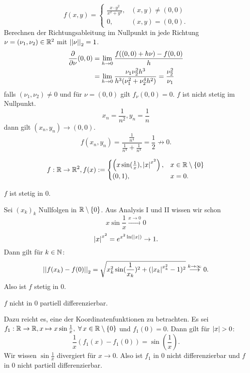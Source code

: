 \documentclass[../ana2u.tex]{subfiles}
\begin{document}
\begin{bsp}
    \[ f(x,y) = \begin{cases}
        \frac{x\cdot y^2}{x^2 + y^2}, &(x,y) \neq (0,0)\\
        0, &(x,y) = (0,0).
    \end{cases} \]
    Berechnen der Richtungsableitung im Nullpunkt 
    in jede Richtung 
    \( \nu = (\nu_1, \nu_2)\in \mathbb{R}^2 \) mit 
    \( \left|\left|\nu\right|\right|_2 = 1 \).
    \begin{align*}
        \frac{\partial}{\partial\nu} (0,0) 
        &= \lim\limits_{h\rightarrow{}0} \frac{ f((0,0) + h \nu) - f(0,0) }{h} \\
        &= \lim\limits_{h\rightarrow{}0} 
        \frac{ \nu_1 \nu_2^2 h^3 }{h^3(\nu_1^2 + \nu_2^4 h^2)}
        = \frac{\nu_2^2}{\nu_1}
    \end{align*}
    falls \( (\nu_1, \nu_2) \neq 0 \) und für \( \nu = (0,0)\) 
    gilt \(f_\nu(0,0) = 0 \).
    \(f\) ist nicht stetig im Nullpunkt.
    \[ x_n = \frac{1}{n^2}, y_n = \frac{1}{n} \]
    dann gilt \( (x_n, y_n) \rightarrow (0,0) \).
    \[ f(x_n, y_n) = 
    \frac{ \frac{1}{n^4} }{ \frac{1}{n^4} + \frac{1}{n^4} } 
    = \frac{1}{2} \not \rightarrow 0. \]
\end{bsp}
\begin{bsp}
    \[ f:\mathbb{R}\rightarrow \mathbb{R}^2, f(x) := \begin{cases}
        \left(x \sin(\frac{1}{x}), \left|x\right|^{x^2}\right),
        &x\in \mathbb{R} \setminus \{0\} \\
        (0,1), &x = 0.
    \end{cases} \]
    \begin{beh}
        \(f\) ist stetig in \(0\). 
    \end{beh}
    Sei \( (x_k)_k \) Nullfolgen in 
    \( \mathbb{R} \setminus \{0\} \). Aus Analysis I und II wissen
    wir schon
    \[ x\sin \frac{1}{x} \overset{x \rightarrow 0}{\longrightarrow} 0 \]
    \[ \left|x\right|^{x^2} = e^{x^2 \ln(\left|x\right|)} \rightarrow 1. \]
    Dann gilt für \( k \in \mathbb{N} \):
    \[ \left|\left|f(x_k) - f(0)\right|\right|_2 
    = \sqrt{x_k^2 \sin(\frac{1}{x_k})^2 + (\left|x_k\right|^{x_k^2} - 1)^2 } 
    \overset{k \rightarrow \infty}{\longrightarrow} 0.\]
    Also ist \(f\) stetig in \(0\).
    \begin{beh}
        \(f\) nicht in \(0\) partiell differenzierbar.
    \end{beh}
    Dazu reicht es, eine der Koordinatenfunktionen zu betrachten.
    Es sei \( \abb{f_1}{\R}{\R}, x \mapsto x \sin \frac{1}{x}, 
    \; \forall x \in \R \setminus \set{0} \)
    und \( f_1(0) = 0 \). Dann gilt für 
    \( \left|x\right| > 0 \): 
    \[ \frac{1}{x} (f_1(x) - f_1(0)) = \sin(\frac{1}{x}). \]
    Wir wissen \( \sin \frac{1}{x} \) divergiert für 
    \(x \rightarrow 0\). Also ist \(f_1\) in \( 0 \) nicht 
    differenzierbar und \( f \) in \(0\) nicht partiell 
    differenzierbar.
\end{bsp}
\end{document}
